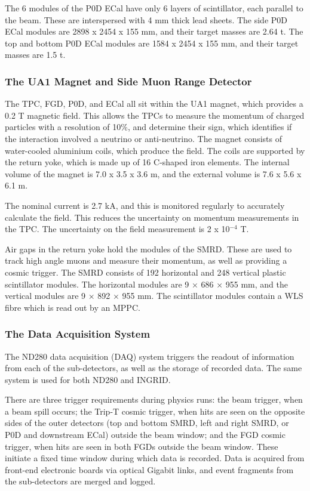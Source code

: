 The 6 modules of the P0D ECal have only 6 layers of scintillator, each parallel to the beam. These are interspersed with 4 mm thick lead sheets. The side P0D ECal modules are 2898 x 2454 x 155 mm, and their target masses are 2.64 t. The top and bottom P0D ECal modules are 1584 x 2454 x 155 mm, and their target masses are 1.5 t.

\subsubsection{The UA1 Magnet and Side Muon Range Detector}\label{sec:mag}

The TPC, FGD, P0D, and ECal all sit within the UA1 magnet, which provides a 0.2 T magnetic field. This allows the TPCs to measure the momentum of charged particles with a resolution of 10$\%$, and determine their sign, which identifies if the interaction involved a neutrino or anti-neutrino. The magnet consists of water-cooled aluminium coils, which produce the field. The coils are supported by the return yoke, which is made up of 16 C-shaped iron elements. The internal volume of the magnet is 7.0 x 3.5 x 3.6 m, and the external volume is 7.6 x 5.6 x 6.1 m.

The nominal current is 2.7 kA, and this is monitored regularly to accurately calculate the field. This reduces the uncertainty on momentum measurements in the TPC. The uncertainty on the field measurement is 2 x 10$^{-4}$ T.

Air gaps in the return yoke hold the modules of the SMRD. These are used to track high angle muons and measure their momentum, as well as providing a cosmic trigger. The SMRD consists of 192 horizontal and 248 vertical plastic scintillator modules. The horizontal modules are 9 × 686 × 955 mm, and the vertical modules are 9 × 892 × 955 mm. The scintillator modules contain a WLS fibre which is read out by an MPPC.

\subsubsection{The Data Acquisition System}\label{sec:daq}

The ND280 data acquisition (DAQ) system triggers the readout of information from each of the sub-detectors, as well as the storage of recorded data. The same system is used for both ND280 and INGRID.

There are three trigger requirements during physics runs: the beam trigger, when a beam spill occurs; the Trip-T cosmic trigger, when hits are seen on the opposite sides of the outer detectors (top and bottom SMRD, left and right SMRD, or P0D and downstream ECal) outside the beam window; and the FGD cosmic trigger, when hits are seen in both FGDs outside the beam window. These initiate a fixed time window during which data is recorded. Data is acquired from front-end electronic boards via optical Gigabit links, and event fragments from the sub-detectors are merged and logged.

